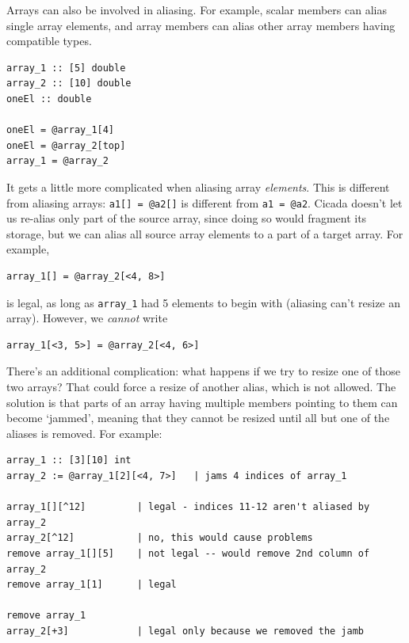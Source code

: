\documentclass{article}
\newenvironment{code}{
       \begin{list}{}{
               \setlength{\leftmargin}{.4in}
               \setlength{\rightmargin}{0in}
               \setlength{\topsep}{.2in}
       }
       \small
       \item[] }
       { \end{list}   }
\begin{document}
Arrays can also be involved in aliasing.  For example, scalar members can alias single array elements, and array members can alias other array members having compatible types.

\begin{code} \begin{verbatim}
array_1 :: [5] double
array_2 :: [10] double
oneEl :: double

oneEl = @array_1[4]
oneEl = @array_2[top]
array_1 = @array_2
\end{verbatim} \end{code}

\noindent It gets a little more complicated when aliasing array \emph{elements}.  This is different from aliasing arrays:  \verb#a1[] = @a2[]# is different from \verb#a1 = @a2#.  Cicada doesn't let us re-alias only part of the source array, since doing so would fragment its storage, but we can alias all source array elements to a part of a target array.  For example, 

\begin{code} \begin{verbatim}
array_1[] = @array_2[<4, 8>]
\end{verbatim} \end{code}

\noindent is legal, as long as \verb#array_1# had 5 elements to begin with (aliasing can't resize an array).  However, we \emph{cannot} write

\begin{code} \begin{verbatim}
array_1[<3, 5>] = @array_2[<4, 6>]
\end{verbatim} \end{code}

There's an additional complication: what happens if we try to resize one of those two arrays?  That could force a resize of another alias, which is not allowed.  The solution is that parts of an array having multiple members pointing to them can become `jammed', meaning that they cannot be resized until all but one of the aliases is removed.  For example:

\begin{code} \begin{verbatim}
array_1 :: [3][10] int
array_2 := @array_1[2][<4, 7>]   | jams 4 indices of array_1

array_1[][^12]         | legal - indices 11-12 aren't aliased by array_2
array_2[^12]           | no, this would cause problems
remove array_1[][5]    | not legal -- would remove 2nd column of array_2
remove array_1[1]      | legal

remove array_1
array_2[+3]            | legal only because we removed the jamb
\end{verbatim} \end{code}
\end{document}
